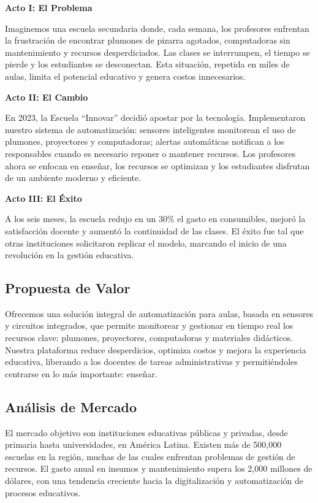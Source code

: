 \textbf{Acto I: El Problema}

Imaginemos una escuela secundaria donde, cada semana, los profesores enfrentan la frustración de encontrar plumones de pizarra agotados, computadoras sin mantenimiento y recursos desperdiciados. Las clases se interrumpen, el tiempo se pierde y los estudiantes se desconectan. Esta situación, repetida en miles de aulas, limita el potencial educativo y genera costos innecesarios.

\textbf{Acto II: El Cambio}

En 2023, la Escuela “Innovar” decidió apostar por la tecnología. Implementaron nuestro sistema de automatización: sensores inteligentes monitorean el uso de plumones, proyectores y computadoras; alertas automáticas notifican a los responsables cuando es necesario reponer o mantener recursos. Los profesores ahora se enfocan en enseñar, los recursos se optimizan y los estudiantes disfrutan de un ambiente moderno y eficiente.

\textbf{Acto III: El Éxito}

A los seis meses, la escuela redujo en un 30\% el gasto en consumibles, mejoró la satisfacción docente y aumentó la continuidad de las clases. El éxito fue tal que otras instituciones solicitaron replicar el modelo, marcando el inicio de una revolución en la gestión educativa.

\subsection{Propuesta de Valor}

Ofrecemos una solución integral de automatización para aulas, basada en sensores y circuitos integrados, que permite monitorear y gestionar en tiempo real los recursos clave: plumones, proyectores, computadoras y materiales didácticos. Nuestra plataforma reduce desperdicios, optimiza costos y mejora la experiencia educativa, liberando a los docentes de tareas administrativas y permitiéndoles centrarse en lo más importante: enseñar.

\subsection{Análisis de Mercado}

El mercado objetivo son instituciones educativas públicas y privadas, desde primaria hasta universidades, en América Latina. Existen más de 500,000 escuelas en la región, muchas de las cuales enfrentan problemas de gestión de recursos. El gasto anual en insumos y mantenimiento supera los 2,000 millones de dólares, con una tendencia creciente hacia la digitalización y automatización de procesos educativos.

